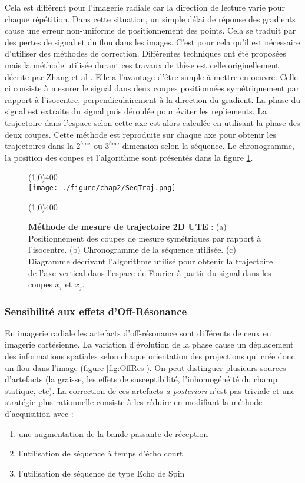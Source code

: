 Cela est différent pour l'imagerie radiale car la direction de lecture varie pour chaque répétition. Dans cette situation, un simple délai de réponse des gradients cause une erreur non-uniforme de positionnement des points. Cela se traduit par des pertes de signal et du flou dans les images. C'est pour cela qu'il est nécessaire d'utiliser des méthodes de correction. Différentes techniques ont été proposées \cite{Alley:1998vn,Addy:2012kx} mais la méthode utilisée durant ces travaux de thèse est celle originellement décrite par Zhang et al \cite{Zhang:1998uq}. Elle a l'avantage d'être simple à mettre en oeuvre.
Celle-ci consiste à mesurer le signal dans deux coupes positionnées symétriquement par rapport à l'isocentre, perpendiculairement à la direction du gradient. La phase du signal est extraite du signal puis déroulée pour éviter les repliements. La trajectoire dans l'espace selon cette axe est alors calculée en utilisant la phase des deux coupes. Cette méthode est reproduite sur chaque axe pour obtenir les trajectoires dans la $2^\text{ème}$ ou $3^\text{ème}$ dimension selon la séquence. Le chronogramme, la position des coupes et l'algorithme sont présentés dans la figure \ref{fig:SeqTraj}.

\begin{figure}[H]
\centering
\line(1,0){400} \\
\texttt{[image: ./figure/chap2/SeqTraj.png]}
\caption[Méthode de mesure des trajectoires 2D.]{\label{fig:SeqTraj}  
\textbf{Méthode de mesure de trajectoire 2D UTE} : (a) Positionnement des coupes de mesure symétriques par rapport à l'isocentre. (b) Chronogramme de la séquence utilisée. (c) Diagramme décrivant l'algorithme utilisé pour obtenir la trajectoire de l'axe vertical dans l'espace de Fourier à partir du signal dans les coupes $x_i$ et $x_j$.}
\line(1,0){400} \\
\end{figure}

\subsubsection{Sensibilité aux effets d'Off-Résonance}

En imagerie radiale les artefacts d'off-résonance sont différents de ceux en imagerie cartésienne. La variation d'évolution de la phase cause un déplacement des informations spatiales selon chaque orientation des projections qui crée donc un flou dans l'image (figure \ref{fig:OffRes}).
On peut distinguer plusieurs sources d'artefacts (la graisse, les effets de susceptibilité, l'inhomogénéité du champ statique, etc). La correction de ces artefacts \textit{a posteriori} n'est pas triviale et une stratégie plus rationnelle consiste à les réduire en modifiant la méthode d'acquisition avec :
\begin{enumerate}
\item une augmentation de la bande passante de réception
\item l'utilisation de séquence à temps d'écho court
\item l'utilisation de séquence de type Echo de Spin
\end{enumerate}

